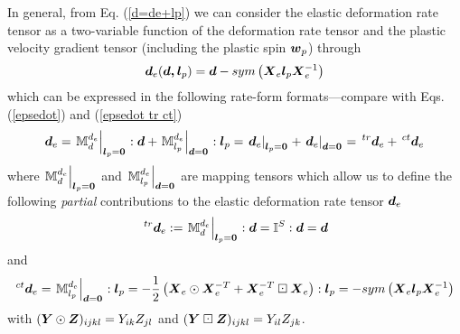 \documentclass[preprint,review,12pt,sort&compress]{elsarticle}%
\newcommand{\lpo}[0]{\scriptsize\mathbf{l}_p = \mathbf{0}\normalsize\mathbf{}}
\newcommand{\doo}[0]{\scriptsize\mathbf{d} = \mathbf{0}\normalsize\mathbf{}}
\renewcommand{\mathbf}[1]{\mbox{\boldmath $#1$ \unboldmath}  \!\!}
\begin{document}
In general, from Eq. (\ref{d=de+lp}) we can consider the elastic deformation
rate tensor as a two-variable function of the deformation rate tensor and the
plastic velocity gradient tensor (including the plastic spin $\mathbf{w}_{p}$)
through%
\begin{equation}
\mathbf{d}_{e}(\mathbf{d,l}_{p})=\mathbf{d}-sym\left(  \mathbf{X}%
_{e}\mathbf{l}_{p}\mathbf{X}_{e}^{-1}\right)  \label{de d lp}%
\end{equation}
which can be expressed in the following rate-form formats---compare with Eqs.
(\ref{epsedot}) and (\ref{epsedot tr ct})%
\begin{equation}
\mathbf{d}_{e}=\left.  \mathbb{M}_{d}^{d_{e}}\right\vert _{%
\lpo
}:\mathbf{d}+\left.  \mathbb{M}_{l_{p}}^{d_{e}}\right\vert _{%
\doo
}:\mathbf{l}_{p}=\left.  \mathbf{d}_{e}\right\vert _{%
\lpo
}+\left.  \mathbf{d}_{e}\right\vert _{%
\doo
}=\,^{tr}\mathbf{d}_{e}+\,^{ct}\mathbf{d}_{e} \label{de tr ct}%
\end{equation}
where $\left.  \mathbb{M}_{d}^{d_{e}}\right\vert _{%
\lpo
}$ and $\left.  \mathbb{M}_{l_{p}}^{d_{e}}\right\vert _{%
\doo
}$ are mapping tensors \cite{CamineroMontansBathe11,LatMonAPM2016} which allow
us to define the following \emph{partial} contributions to the elastic
deformation rate tensor $\mathbf{d}_{e}$%
\begin{equation}
\,^{tr}\mathbf{d}_{e}:=\left.  \mathbb{M}_{d}^{d_{e}}\right\vert _{%
\lpo
}:\mathbf{d}=\mathbb{I}^{S}:\mathbf{d}=\mathbf{d} \label{de tr}%
\end{equation}
and%
\begin{equation}
^{ct}\mathbf{d}_{e}=\left.  \mathbb{M}_{l_{p}}^{d_{e}}\right\vert _{%
\doo
}:\mathbf{l}_{p}=-\frac{1}{2}\left(  \mathbf{X}_{e}\odot\mathbf{X}_{e}%
^{-T}+\mathbf{X}_{e}^{-T}\boxdot\mathbf{X}_{e}\right)  :\mathbf{l}%
_{p}=-sym\left(  \mathbf{X}_{e}\mathbf{l}_{p}\mathbf{X}_{e}^{-1}\right)
\label{de ct}%
\end{equation}
with $(\mathbf{Y}\odot\mathbf{Z})_{ijkl}=Y_{ik}Z_{jl}$ and $(\mathbf{Y\boxdot
Z})_{ijkl}=Y_{il}Z_{jk}$.
\end{document}

